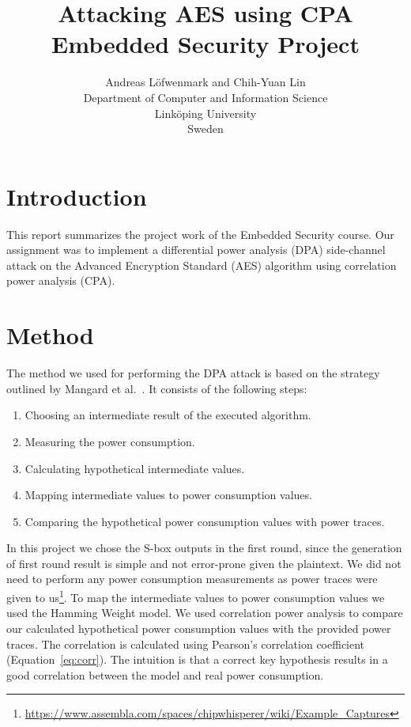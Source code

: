 \documentclass{article}
\title{\Large \textbf{Attacking AES using CPA}\\
Embedded Security Project
}
\author{
{\rm Andreas L\"{o}fwenmark and Chih-Yuan Lin}\\
Department of Computer and Information Science\\
Linköping University\\
Sweden
}
\begin{document}

\maketitle

\section{Introduction}
This report summarizes the project work of the Embedded Security course. Our assignment was to implement a differential power analysis (DPA) side-channel attack on the Advanced Encryption Standard (AES) algorithm using correlation power analysis (CPA).


\section{Method}
The method we used for performing the DPA attack is based on the strategy outlined by Mangard et al.~\cite[Ch.\ 6]{paa2007}. It consists of the following steps:
\begin{enumerate}
\item Choosing an intermediate result of the executed algorithm.
\item Measuring the power consumption.
\item Calculating hypothetical intermediate values.
\item Mapping intermediate values to power consumption values.
\item Comparing the hypothetical power consumption values with power traces.
\end{enumerate}
In this project we chose the S-box outputs in the first round, since the generation of first round result is simple and not error-prone given the plaintext. We did not need to perform any power consumption measurements as power traces were given to us\footnote{\url{https://www.assembla.com/spaces/chipwhisperer/wiki/Example_Captures}}. To map the intermediate values to power consumption values we used the Hamming Weight model. We used correlation power analysis to compare our calculated hypothetical power consumption values with the provided power traces. The correlation is calculated using Pearson's correlation coefficient (Equation~\ref{eq:corr}). The intuition is that a correct key hypothesis results in a good correlation between the model and real power consumption. 
\end{document}
